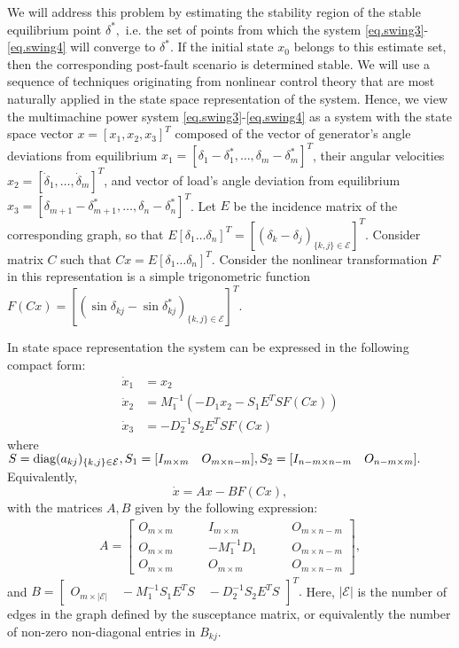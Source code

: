 \documentclass[final]{IEEEtran}
\begin{document}
We will address this problem by estimating the stability region of the stable equilibrium point $\delta^*,$
i.e. the set of points from which the system \eqref{eq.swing3}-\eqref{eq.swing4} will converge to $\delta^*.$ If the initial state $x_0$ belongs to this estimate set,
then the corresponding post-fault scenario is determined stable.
We will use a sequence of techniques
originating from nonlinear control theory that are most naturally
applied in the state space representation of the system. Hence, we
view the multimachine power system \eqref{eq.swing3}-\eqref{eq.swing4} as a system
with the state space vector $x = [x_1,x_2,x_3]^T$
composed of the vector of generator's angle deviations from equilibrium $x_1 =
[\delta_1 - \delta_1^*,\dots, \delta_m - \delta_m^*]^T$, their
angular velocities $x_2 = [\dot\delta_1,\dots,\dot\delta_m]^T$, and vector of load's angle deviation from equilibrium
$x_3=[\delta_{m+1}-\delta_{m+1}^*,\dots,\delta_n-\delta_n^*]^T$. 
Let $E$ be the
incidence matrix of the corresponding graph, so that
$E[\delta_1\dots\delta_n]^T =
[(\delta_k-\delta_j)_{\{k,j\}\in\mathcal{E}}]^T$. Consider matrix $C$ such that $Cx=E[\delta_1\dots\delta_n]^T.$  Consider the nonlinear transformation $F$ in this
representation is a simple trigonometric function $
F(Cx)=[(\sin\delta_{kj}-\sin\delta^*_{kj})_{\{k,j\}\in\mathcal{E}}]^T.$

In
state space representation the system can be expressed in the
following compact form:
\begin{align}
\dot{x}_1 &=x_2 \nonumber \\
\dot{x}_2 &=M_1^{-1}(-D_1x_2-S_1E^TSF(Cx))  \\
\dot{x}_3 &= -D_2^{-1}S_2E^TS F(Cx) \nonumber
\end{align}
where $S=\emph{\emph{diag}}(a_{kj})_{\{k,j\}\in \mathcal{E}}, S_1=[I_{m\times m}\quad O_{m\times n-m}], S_2=[I_{n-m\times n-m} \quad O_{n-m\times m}].$
Equivalently,
\begin{equation}\label{eq.Bilinear}
 \dot x = A x - B F(C x),
\end{equation}
with the matrices $A,B$ given by the following expression:
\begin{align}
A=\left[
        \begin{array}{ccccc}
          O_{m \times m} \qquad & I_{m \times m}  \qquad & O_{m \times n-m}\\
          O_{m \times m} \qquad & -M_1^{-1}D_1 \qquad & O_{m \times n-m} \\
          O_{m \times m} \qquad &O_{m \times m} \qquad & O_{m \times n-m}
        \end{array}
      \right],
\end{align}
and $
 B= \left[
        \begin{array}{ccccc}
          O_{m \times |\mathcal{E}|} \quad
          -M_1^{-1}S_1E^TS \quad
          -D_2^{-1}S_2E^TS
        \end{array}
      \right]^T.$
Here, $|\mathcal{E}|$ is the number of edges in the graph defined
by the susceptance matrix, or equivalently the
number of non-zero non-diagonal entries in $B_{kj}$.  
\end{document}
